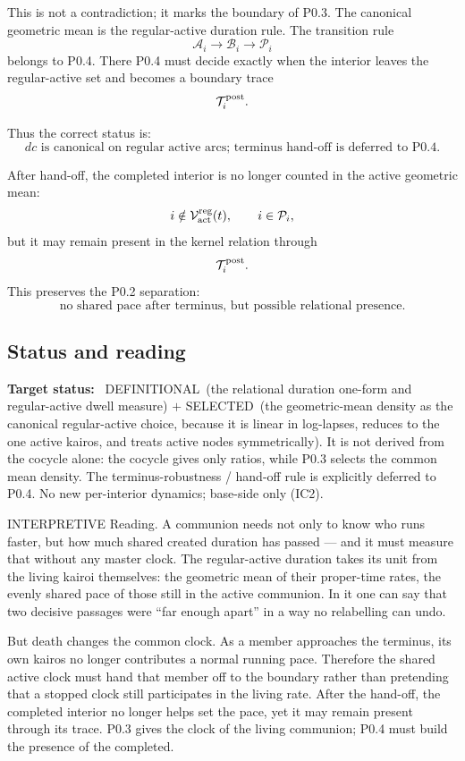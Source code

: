 \documentclass[11pt,a4paper]{article}
\def\mathfrak#1{#1}%
\def\emph#1{#1}%
\newcommand{\stDef}{\textcolor{cDef}{\textsf{\small DEFINITIONAL}}}
\newcommand{\stSelected}{\textcolor{cSel}{\textsf{\small SELECTED}}}
\newcommand{\stInterp}{\textcolor{cInt}{\textsf{\small INTERPRETIVE}}}
\theoremstyle{definition}
\theoremstyle{plain}
\theoremstyle{remark}
\begin{document}
This is not a contradiction; it marks the boundary of P0.3. The canonical
geometric mean is the regular-active duration rule. The transition rule
\[
\mathcal A_i
\longrightarrow
\mathcal B_i
\longrightarrow
\mathcal P_i
\]
belongs to P0.4. There P0.4 must decide exactly when the interior leaves the
regular-active set and becomes a boundary trace
\[
\mathcal T_i^{\rm post}.
\]

Thus the correct status is:
\[
\boxed{
d\mathfrak c
\text{ is canonical on regular active arcs; terminus hand-off is deferred to P0.4.}
}
\]

After hand-off, the completed interior is no longer counted in the active
geometric mean:
\[
i\notin\mathcal V_{\rm act}^{\rm reg}(t),
\qquad
i\in\mathcal P_i,
\]
but it may remain present in the kernel relation through
\[
\mathcal T_i^{\rm post}.
\]
This preserves the P0.2 separation:
\[
\text{no shared pace after terminus, but possible relational presence.}
\]

\subsection{Status and reading}

\textbf{Target status:}~
\stDef\ (the relational duration one-form and regular-active dwell measure)
\(+\)
\stSelected\ (the geometric-mean density as the canonical regular-active choice,
because it is linear in log-lapses, reduces to the one active kairos, and treats
active nodes symmetrically).
It is not derived from the cocycle alone: the cocycle gives only ratios, while
P0.3 selects the common mean density. The terminus-robustness / hand-off rule is
explicitly deferred to P0.4. No new per-interior dynamics; base-side only (IC2).

\medskip
\stInterp\quad
\emph{Reading.}
A communion needs not only to know who runs faster, but how much shared created
duration has passed --- and it must measure that without any master clock. The
regular-active duration takes its unit from the living kairoi themselves: the
geometric mean of their proper-time rates, the evenly shared pace of those still
in the active communion. In it one can say that two decisive passages were
``far enough apart'' in a way no relabelling can undo.

But death changes the common clock. As a member approaches the terminus, its own
kairos no longer contributes a normal running pace. Therefore the shared active
clock must hand that member off to the boundary rather than pretending that a
stopped clock still participates in the living rate. After the hand-off, the
completed interior no longer helps set the pace, yet it may remain present through
its trace. P0.3 gives the clock of the living communion; P0.4 must build the
presence of the completed.
\end{document}
